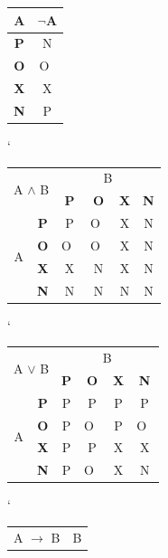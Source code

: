 \documentclass[11pt,a4paper]{article}
\begin{document}
		\begin{table}[h]
			\centering
			\begin{tabular}{|c|c|}
				\hline
				\multicolumn{1}{|c|}{A} & $\neg$A \\ \hline
				\textbf{P}                       & N \\ \hline
				\textbf{O}                       & O~\\ \hline
				\textbf{X}                       & X \\ \hline
				\textbf{N}                       & P \\ \hline
			\end{tabular}
		\catcode` %
		\begin{tabular}{|c|c|c|c|c|c|}
			\hline
			\multicolumn{2}{|c|}{\multirow{2}{*}{A $\wedge$ B}} & \multicolumn{4}{c|}{B} \\ \cline{3-6} 
			\multicolumn{2}{|c|}{}                   & \textbf{P}    & \textbf{O}   & \textbf{X}   & \textbf{N}   \\ \hline
			\multirow{4}{*}{A}          & \textbf{P}          & P    & O~& X   & N   \\ \cline{2-6} 
			& \textbf{O}          & O~& O~& X   & N   \\ \cline{2-6} 
			& \textbf{X}          & X    & N   & X   & N   \\ \cline{2-6} 
			& \textbf{N}          & N    & N   & N   & N   \\ \hline
		\end{tabular}
	\catcode` %
	\begin{tabular}{|c|c|c|c|c|c|}
		\hline
		\multicolumn{2}{|c|}{\multirow{2}{*}{A $\vee$ B}} & \multicolumn{4}{c|}{B} \\ \cline{3-6} 
		\multicolumn{2}{|c|}{}                   & \textbf{P}    & \textbf{O}   & \textbf{X}   & \textbf{N}   \\ \hline
		\multirow{4}{*}{A}          & \textbf{P}          & P    & P   & P   & P   \\ \cline{2-6} 
		& \textbf{O}          & P    & O~& P   & O~\\ \cline{2-6} 
		& \textbf{X}          & P    & P   & X   & X   \\ \cline{2-6} 
		& \textbf{N}          & P    & O~& X   & N   \\ \hline
	\end{tabular}
	\catcode` %
	\begin{tabular}{|c|c|c|c|c|c|}
		\hline
		\multicolumn{2}{|c|}{\multirow{2}{*}{A $\rightarrow$ B}} & \multicolumn{4}{c|}{B} \\ \cline{3-6} 

\end{tabular}
\end{table}
\end{document}
